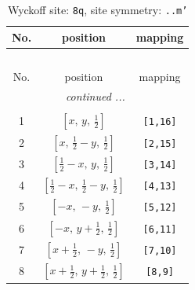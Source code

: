 \documentclass[fleqn,8pt]{jsarticle}
\begin{document}
\begin{longtable}{ccc}
\caption{Wyckoff site: {\tt 8q}, site symmetry: {\tt ..m'}}
 \\
 \hline \hline
No. & position & mapping \\ \hline \endfirsthead

\multicolumn{2}{l}{\tablename\ \thetable{}} \\
 \hline \hline
No. & position & mapping \\ \hline \endhead

 \hline \hline
\multicolumn{2}{r}{\footnotesize\it continued ...} \\ \endfoot

 \hline \hline
\multicolumn{2}{r}{} \\ \endlastfoot

1 & $\left[ x,\, y,\, \frac{1}{2} \right]$ & {\tt [1,16]} \\ \hline
2 & $\left[ x,\, \frac{1}{2} - y,\, \frac{1}{2} \right]$ & {\tt [2,15]} \\ \hline
3 & $\left[ \frac{1}{2} - x,\, y,\, \frac{1}{2} \right]$ & {\tt [3,14]} \\ \hline
4 & $\left[ \frac{1}{2} - x,\, \frac{1}{2} - y,\, \frac{1}{2} \right]$ & {\tt [4,13]} \\ \hline
5 & $\left[ - x,\, - y,\, \frac{1}{2} \right]$ & {\tt [5,12]} \\ \hline
6 & $\left[ - x,\, y + \frac{1}{2},\, \frac{1}{2} \right]$ & {\tt [6,11]} \\ \hline
7 & $\left[ x + \frac{1}{2},\, - y,\, \frac{1}{2} \right]$ & {\tt [7,10]} \\ \hline
8 & $\left[ x + \frac{1}{2},\, y + \frac{1}{2},\, \frac{1}{2} \right]$ & {\tt [8,9]} \\
\end{longtable}
\renewcommand{\arraystretch}{1.2}
\end{document}

